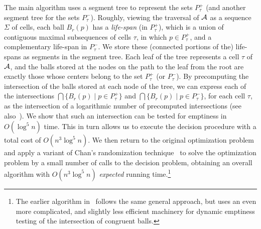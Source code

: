 \documentclass[a4paper,12pt]{article}
\def\A{{\cal A}}
\begin{document}
The main algorithm uses a segment tree to represent the sets
$P_\tau^+$ (and another segment tree for the sets $P_\tau^-$).
Roughly, viewing the traversal of $\A$ as a sequence $\Sigma$ of
cells, each ball $B_r(p)$ has a \emph{life-span} (in $P_\tau^+$),
which is a union of contiguous maximal subsequences of cells $\tau$,
in which $p \in P_\tau^+$, and a complementary life-span in
$P_\tau^-$. We store these (connected portions of the) life-spans as
segments in the segment tree. Each leaf of the tree represents a
cell $\tau$ of $\A$, and the balls stored at the nodes on the path
to the leaf from the root are exactly those whose centers belong to
the set $P_\tau^+$ (or $P_\tau^-$). By precomputing the intersection
of the balls stored at each node of the tree, we can express each of
the intersections $\bigcap\{B_r(p) \mid p \in P_\tau^+\}$ and
$\bigcap\{B_r(p) \mid p \in P_\tau^-\}$, for each cell $\tau$, as
the intersection of a logarithmic number of precomputed
intersections (see also~\cite{DE}). We show that such an
intersection can be tested for emptiness in $O(\log^5 n)$ time. This
in turn allows us to execute the decision procedure with a total
cost of $O(n^3 \log^5 n)$. We then return to the original
optimization problem and apply a variant of Chan's randomization
technique~\cite{TCG} to solve the optimization problem by a small
number of calls to the decision problem, obtaining an overall
algorithm with $O(n^3 \log^5 n)$ \emph{expected} running
time.\footnote{\small The earlier algorithm in~\cite{AES} follows
the same general approach, but uses an even more complicated, and
slightly less efficient machinery for dynamic emptiness testing of
the intersection of congruent balls.}
\end{document}
